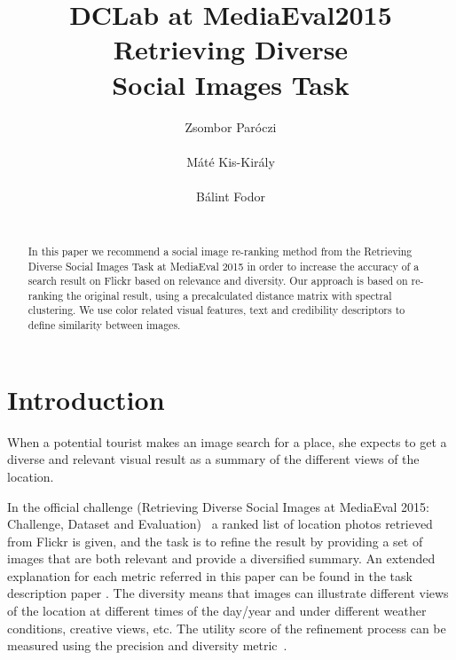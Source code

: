 \documentclass{acm_proc_article-me}
\begin{document}

\title{DCLab at MediaEval2015 Retrieving Diverse \\ Social Images Task}


\author{
\alignauthor
Zsombor Par\'oczi\\
       \\
\alignauthor
M\'at\'e Kis-Kir\'aly \\
		\\
\alignauthor
B\'alint Fodor\\
		\\
}

\maketitle
\begin{abstract}
In this paper we recommend a social image re-ranking method from the Retrieving Diverse Social Images Task at MediaEval 2015 in order to increase the accuracy of a search result on Flickr based on relevance and diversity. Our approach is based on re-ranking the original result, using a precalculated distance matrix with spectral clustering. We use color related visual features, text and credibility descriptors to define similarity between images.
\end{abstract}

\section{Introduction}

When a potential tourist makes an image search for a place, she expects to get a diverse and relevant visual result as a summary of the different views of the location. 

In the official challenge (Retrieving Diverse Social Images at MediaEval 2015: Challenge, Dataset and Evaluation)~\cite{Task2015} a ranked list of location photos retrieved from Flickr is given, and the task is to refine the result by providing a set of images that are both relevant and provide a diversified summary. An extended explanation for each metric referred in this paper can be found in the task description paper \cite{Task2015}. The diversity means that images can illustrate different views of the location at different times of the day/year and under different weather conditions, creative views, etc. The utility score of the refinement process can be measured using the precision and diversity metric~\cite{Taneva2010}. 
\end{document}
